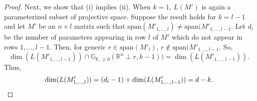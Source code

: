 \documentclass[11pt]{article}
\newcommand{\R}{\mathbb{R}}
\newcommand{\Gr}{\mathbb{G}_{\R, \geq 0}}
\theoremstyle{remark}
\theoremstyle{definition}
\begin{document}
\begin{appendices}
\begin{proof}
Next, we show that (i) implies (ii). When $k = 1$, $L(M')$ is again a parameterized subset of projective space. Suppose the result holds for $k = l-1$ and let $M'$ be an $n \times l$ matrix such that $\mathrm{span}(M'_{1,\dots,l}) \neq \mathrm{span}(M'_{1,\dots,l-1}$. Let $d_l$ be the number of parameters appearing in row $l$ of $M'$ which do not appear in rows $1, \dots, l-1$. Then, for generic $r \in \mathrm{span}(M'_{l})$, $r \notin \mathrm{span}(M'_{1,\dots,l-1}$. So,
%
\begin{displaymath}
\dim(L(M'_{1,\dots,l-1})) \cap \Gr(\mathbb{R}^n \perp r, k-1)) = \dim(L(M'_{1,\dots,l-1})).
\end{displaymath}
%
\noindent
Thus,
%
\begin{displaymath}
\dim(L(M'_{1,\dots,l})) = (d_l - 1) + \dim(L(M'_{1,\dots,l-1})) = d-k.
\qedhere
\end{displaymath}
\end{proof}


\end{appendices}
\end{document}
